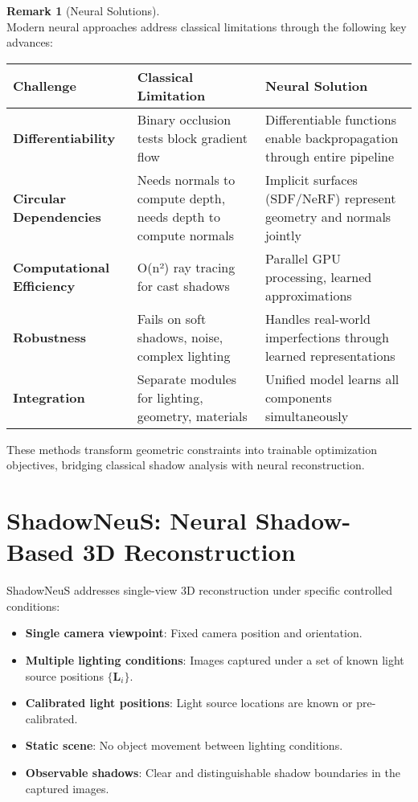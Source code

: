 \documentclass[12pt]{article}
\theoremstyle{definition}
\newtheorem{remark}{Remark}[subsection]
\begin{document}
\newpage

\begin{remark}[Neural Solutions] \label{rmk:neural_solutions} ~\\
Modern neural approaches address classical limitations through the following key advances:

\begin{center}
\begin{tabular}{|l|p{5.5cm}|p{5.5cm}|}
\hline
\textbf{Challenge} & \textbf{Classical Limitation} & \textbf{Neural Solution} \\
\hline
\textbf{Differentiability} & Binary occlusion tests block gradient flow & Differentiable functions enable backpropagation through entire pipeline \\
\hline
\textbf{Circular Dependencies} & Needs normals to compute depth, needs depth to compute normals & Implicit surfaces (SDF/NeRF) represent geometry and normals jointly \\
\hline
\textbf{Computational Efficiency} & O(n²) ray tracing for cast shadows & Parallel GPU processing, learned approximations \\
\hline
\textbf{Robustness} & Fails on soft shadows, noise, complex lighting & Handles real-world imperfections through learned representations \\
\hline
\textbf{Integration} & Separate modules for lighting, geometry, materials & Unified model learns all components simultaneously \\
\hline
\end{tabular}
\end{center}

These methods transform geometric constraints into trainable optimization objectives, bridging classical shadow analysis with neural reconstruction.
\end{remark}

\section{ShadowNeuS: Neural Shadow-Based 3D Reconstruction} \label{sec:shadowneus}

ShadowNeuS addresses single-view 3D reconstruction under specific controlled conditions:

\begin{itemize}
    \item \textbf{Single camera viewpoint}: Fixed camera position and orientation.
    \item \textbf{Multiple lighting conditions}: Images captured under a set of known light source positions $\{\mathbf{L}_i\}$.
    \item \textbf{Calibrated light positions}: Light source locations are known or pre-calibrated.
    \item \textbf{Static scene}: No object movement between lighting conditions.
    \item \textbf{Observable shadows}: Clear and distinguishable shadow boundaries in the captured images.
\end{itemize}
\end{document}
